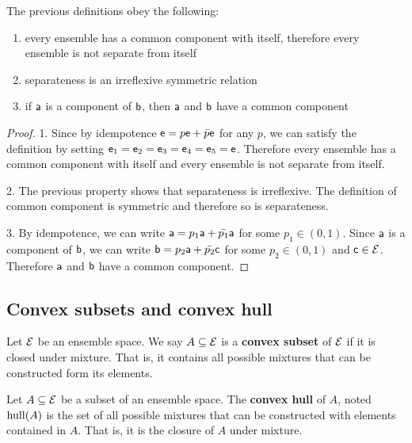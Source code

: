 \begin{coro}
	The previous definitions obey the following:
	\begin{enumerate}
		\item every ensemble has a common component with itself, therefore every ensemble is not separate from itself
		\item separateness is an irreflexive symmetric relation
		\item if $\ens[a]$ is a component of $\ens[b]$, then $\ens[a]$ and $\ens[b]$ have a common component
	\end{enumerate}
\end{coro}

\begin{proof}
	1. Since by idempotence $\ens = p \ens + \bar{p} \ens$ for any $p$, we can satisfy the definition by setting $\ens_1 = \ens_2 = \ens_3 = \ens_4 = \ens_5 = \ens$. Therefore every ensemble has a common component with itself and every ensemble is not separate from itself.
	
	2. The previous property shows that separateness is irreflexive. The definition of common component is symmetric and therefore so is separateness.
	
	3. By idempotence, we can write $\ens[a] = p_1 \ens[a] + \bar{p_1} \ens[a]$ for some $p_1 \in (0,1)$. Since $\ens[a]$ is a component of $\ens[b]$, we can write $\ens[b] = p_2 \ens[a] + \bar{p_2} \ens[c]$ for some $p_2 \in (0, 1)$ and $\ens[c] \in \Ens$. Therefore $\ens[a]$ and $\ens[b]$ have a common component.
\end{proof}

\subsection{Convex subsets and convex hull}

\begin{defn}
	Let $\Ens$ be an ensemble space. We say $A \subseteq \Ens$ is a \textbf{convex subset} of $\Ens$ if it is closed under mixture. That is, it contains all possible mixtures that can be constructed form its elements.
\end{defn}

\begin{defn}
	Let $A \subseteq \Ens$ be a subset of an ensemble space. The \textbf{convex hull} of $A$, noted $\hull(A)$ is the set of all possible mixtures that can be constructed with elements contained in $A$. That is, it is the closure of $A$ under mixture.
\end{defn}

